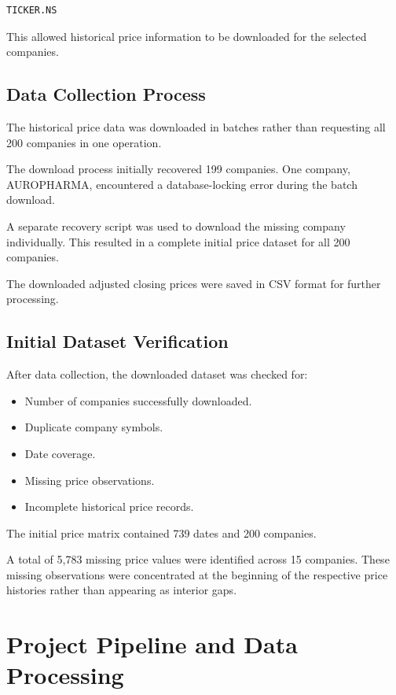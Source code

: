 \documentclass[11pt,a4paper]{article}
\begin{document}
\begin{lstlisting}
TICKER.NS
\end{lstlisting}

This allowed historical price information to be downloaded
for the selected companies.

\subsection{Data Collection Process}

The historical price data was downloaded in batches rather
than requesting all 200 companies in one operation.

The download process initially recovered 199 companies.
One company, AUROPHARMA, encountered a database-locking error
during the batch download.

A separate recovery script was used to download the missing
company individually. This resulted in a complete initial
price dataset for all 200 companies.

The downloaded adjusted closing prices were saved in CSV
format for further processing.

\subsection{Initial Dataset Verification}

After data collection, the downloaded dataset was checked
for:

\begin{itemize}
    \item Number of companies successfully downloaded.
    \item Duplicate company symbols.
    \item Date coverage.
    \item Missing price observations.
    \item Incomplete historical price records.
\end{itemize}

The initial price matrix contained 739 dates and 200 companies.

A total of 5,783 missing price values were identified across
15 companies. These missing observations were concentrated
at the beginning of the respective price histories rather
than appearing as interior gaps.

\section{Project Pipeline and Data Processing}
\end{document}
